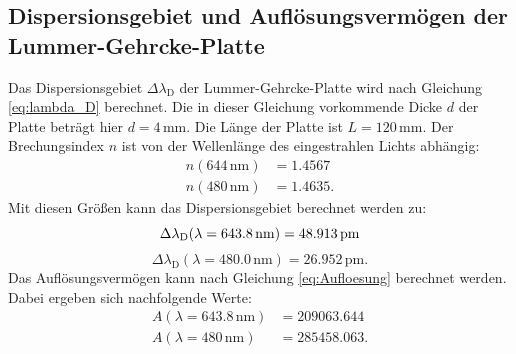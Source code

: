 \subsection{Dispersionsgebiet und Auflösungsvermögen der Lummer-Gehrcke-Platte}
\label{sec:disp_aufl_lummer}
Das Dispersionsgebiet $\Delta \lambda_\text{D}$ der Lummer-Gehrcke-Platte
wird nach Gleichung \ref{eq:lambda_D} berechnet. Die in dieser Gleichung
vorkommende Dicke $d$ der Platte beträgt hier $d=4\,\si{\milli\meter}$.
Die Länge der Platte ist $L = 120 \,\si{\milli\meter}$. Der Brechungsindex $n$ ist
von der Wellenlänge des eingestrahlen Lichts abhängig:
\begin{align*}
  n(644\,\si{\nano\meter}) &= 1.4567\\
  n(480\,\si{\nano\meter}) &= 1.4635.
\end{align*}
Mit diesen Größen kann das Dispersionsgebiet berechnet werden zu:
\begin{equation}
  \label{eq:rot_Dispersionsg}
  \Delta \lambda_\text{D}(\lambda=643.8\,\si{\nano\meter}) = 48.913\,\si{\pico\meter}\\
\end{equation}
\begin{equation}
  \label{eq:blau_Dispersionsg}
  \Delta \lambda_\text{D}(\lambda=480.0\,\si{\nano\meter}) = 26.952\,\si{\pico\meter}.
\end{equation}
Das Auflösungsvermögen kann nach Gleichung \ref{eq:Aufloesung} berechnet werden.
Dabei ergeben sich nachfolgende Werte:
\begin{align}
  A(\lambda=643.8\,\si{\nano\meter})&=209063.644\\
  A(\lambda=480\,\si{\nano\meter})&=285458.063.
\end{align}


